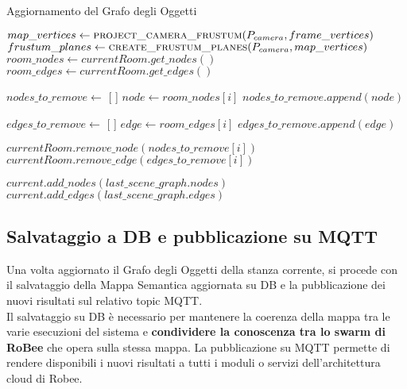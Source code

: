 \begin{algorithm}[H]
  \caption{Aggiornamento del Grafo degli Oggetti}
  \begin{algorithmic}[1]
    \State $map\_vertices \gets \Call{project\_camera\_frustum}{P_{camera}, frame\_vertices}$
    \State $frustum\_planes \gets \Call{create\_frustum\_planes}{P_{camera},map\_vertices}$
    \State $room\_nodes \gets currentRoom.get\_nodes()$
    \State $room\_edges \gets currentRoom.get\_edges()$

    \State $nodes\_to\_remove \gets$ [ ] 
    \State $node \gets room\_nodes[i]$
    \State $nodes\_to\_remove.append(node)$
    \EndIf
    \EndFor

    \State $edges\_to\_remove \gets$ [ ] 
    \State $edge \gets room\_edges[i]$
    \State $edges\_to\_remove.append(edge)$
    \EndIf
    \EndFor

     
    \State $currentRoom.remove\_node(nodes\_to\_remove[i])$
    \EndFor
    \State $currentRoom.remove\_edge(edges\_to\_remove[i])$
    \EndFor

    \State $current.add\_nodes(last\_scene\_graph.nodes)$ 
    \State $current.add\_edges(last\_scene\_graph.edges)$
  \end{algorithmic}
\end{algorithm}

\subsection{Salvataggio a DB e pubblicazione su MQTT}
Una volta aggiornato il Grafo degli Oggetti della stanza corrente, si procede con il salvataggio della Mappa Semantica aggiornata su DB e la pubblicazione dei nuovi risultati sul relativo topic MQTT.\\
Il salvataggio su DB è necessario per mantenere la coerenza della mappa tra le varie esecuzioni del sistema e \textbf{condividere la conoscenza tra lo swarm di RoBee} che opera sulla stessa mappa. La pubblicazione su MQTT permette di rendere disponibili i nuovi risultati a tutti i moduli o servizi dell'architettura cloud di Robee.

